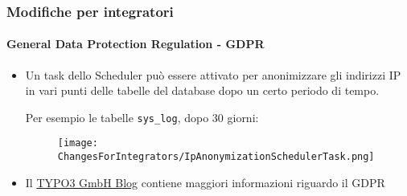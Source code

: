 
\begin{frame}[fragile]
	\frametitle{Modifiche per integratori}
	\framesubtitle{General Data Protection Regulation - GDPR}

	\begin{itemize}
		\item Un task dello Scheduler può essere attivato per anonimizzare gli indirizzi IP 
			in vari punti delle tabelle del database dopo un certo periodo di tempo.\newline

			Per esempio le tabelle \texttt{sys\_log}, dopo 30 giorni:
			\begin{figure}
				\texttt{[image: ChangesForIntegrators/IpAnonymizationSchedulerTask.png]}
			\end{figure}

		\item Il \href{https://typo3.com/blog/tag/gdpr/}{TYPO3 GmbH Blog}
			contiene maggiori informazioni riguardo il GDPR
	\end{itemize}

\end{frame}


